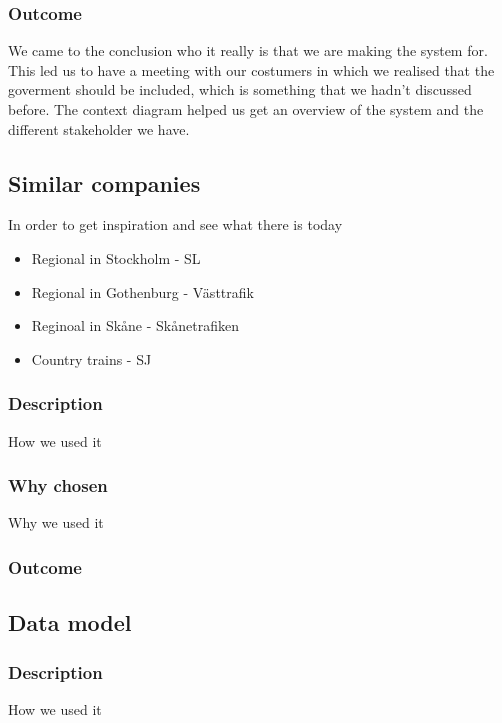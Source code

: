 \documentclass[a4paper]{article}
\begin{document}
    \subsubsection{Outcome}
    We came to the conclusion who it really is that we are making the system for. This led us to have a meeting with our costumers in which we realised that the goverment should be included, which is something that we hadn't discussed before.
    The context diagram helped us get an overview of the system and the different stakeholder we have.
    
    
    \subsection{Similar companies}
    In order to get inspiration and see what there is today
	\begin{itemize}
		\item Regional in Stockholm - SL
		\item Regional in Gothenburg - Västtrafik
		\item Reginoal in Skåne - Skånetrafiken
		\item Country trains - SJ
	\end{itemize}
    
    
    \subsubsection{Description}
    How we used it
    \subsubsection{Why chosen}
    Why we used it
    \subsubsection{Outcome}
    

    \subsection{Data model}

    \subsubsection{Description}
    How we used it
\end{document}
